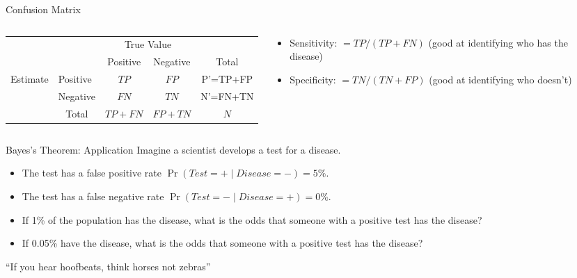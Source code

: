 \documentclass[aspectratio=169,11pt]{beamer}
\begin{document}
\begin{frame}{Confusion Matrix}
\begin{columns}
\begin{column}{0.6\textwidth}
\begin{tabular}{l|l|c|c|c}
\multicolumn{2}{c}{}&\multicolumn{2}{c}{True Value}&\\ 
\cmidrule{3-4}
\multicolumn{2}{c|}{}&Positive&Negative&\multicolumn{1}{c}{Total}\\
\cmidrule{2-4}
\multirow{2}{*}{Estimate}& Positive & $TP$ & $ FP$ & P'=TP+FP\\
\cmidrule{2-4}
& Negative & $ FN $ & $ TN $ & N'=FN+TN\\
\cmidrule{2-4}
\multicolumn{1}{c}{} & \multicolumn{1}{c}{Total} & \multicolumn{1}{c}{$TP+FN$} & \multicolumn{    1}{c}{$FP+TN$} & \multicolumn{1}{c}{$N$}\\
\end{tabular}
\end{column}
\begin{column}{0.4\textwidth}
\begin{itemize}
	\item Sensitivity: $=TP/(TP + FN)$ (good at identifying who has the disease)
	\item Specificity: $=TN/(TN + FP)$ (good at identifying who doesn't)
\end{itemize}
\end{column}
\end{columns}
\end{frame}


\begin{frame}{Bayes's Theorem: Application}
Imagine a scientist develops a test for a disease.
\begin{itemize}
	\item The test has a false positive rate $\Pr(Test = + \mid Disease = -) = 5\%$.
	\item The test has a false negative rate $\Pr(Test = - \mid Disease = +) = 0\%$.
\end{itemize}
\begin{itemize}
	\item If 1\% of the population has the disease, what is the odds that someone with a positive test has the disease?
	\item If 0.05\% have the disease, what is the odds that someone with a positive test has the disease?
\end{itemize}
``If you hear hoofbeats, think horses not zebras''
\end{frame}
\end{document}
